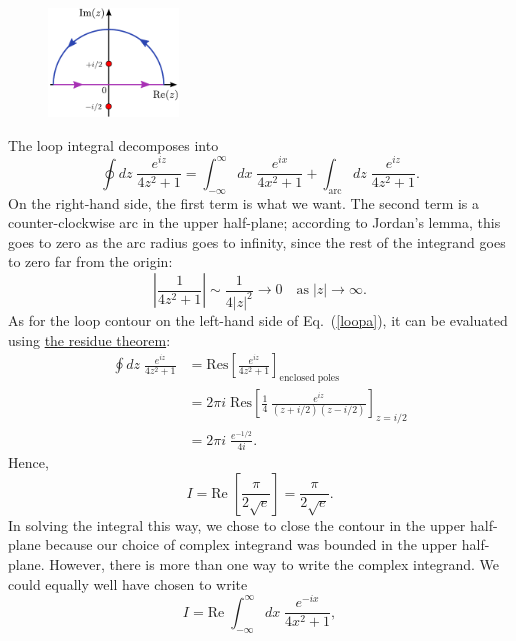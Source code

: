 \documentclass[10pt,a4paper]{article}
\begin{document}
\begin{figure}[h]
  \centering\includegraphics[width=0.31\textwidth]{contour_example3}
\end{figure}

The loop integral decomposes into
\begin{equation}
  \oint dz \; \frac{e^{iz}}{4z^2 + 1} =
  \int_{-\infty}^\infty dx\; \frac{e^{ix}}{4x^2 + 1}
  + \int_{\mathrm{arc}} dz \; \frac{e^{iz}}{4z^2 + 1}.
  \label{loopa}
\end{equation}
On the right-hand side, the first term is what we want. The second
term is a counter-clockwise arc in the upper half-plane; according to
Jordan's lemma, this goes to zero as the arc radius goes to infinity,
since the rest of the integrand goes to zero far from the origin:
\begin{equation}
  \left|\frac{1}{4z^2 + 1}\right| \sim \frac{1}{4|z|^2} \rightarrow 0
  \quad \mathrm{as} \;|z| \rightarrow \infty.
\end{equation}
As for the loop contour on the left-hand side of Eq.~(\ref{loopa}), it
can be evaluated using \hyperref[residue_theorem]{the residue
  theorem}:
\begin{align}
  \oint dz \; \frac{e^{iz}}{4z^2 + 1}
  &= \mathrm{Res}\left[\frac{e^{iz}}{4z^2 + 1}\right]_{\mathrm{enclosed}\;\mathrm{poles}}\\
  &= 2\pi i \; \mathrm{Res}\left[\frac{1}{4}\, \frac{e^{iz}}{(z+i/2)(z-i/2)}\right]_{z = i/2} \\
  &= 2\pi i \; \frac{e^{-1/2}}{4i}.
\end{align}
Hence,
\begin{equation}
  I = \mathrm{Re}\;\left[\frac{\pi}{2\sqrt{e}}\right]= \frac{\pi}{2\sqrt{e}}.
\end{equation}
In solving the integral this way, we chose to close the contour in the
upper half-plane because our choice of complex integrand was bounded
in the upper half-plane. However, there is more than one way to write
the complex integrand. We could equally well have chosen to write
\begin{equation}
  I = \mathrm{Re} \; \int_{-\infty}^\infty dx\; \frac{e^{-ix}}{4x^2 + 1},
\end{equation}
\end{document}
